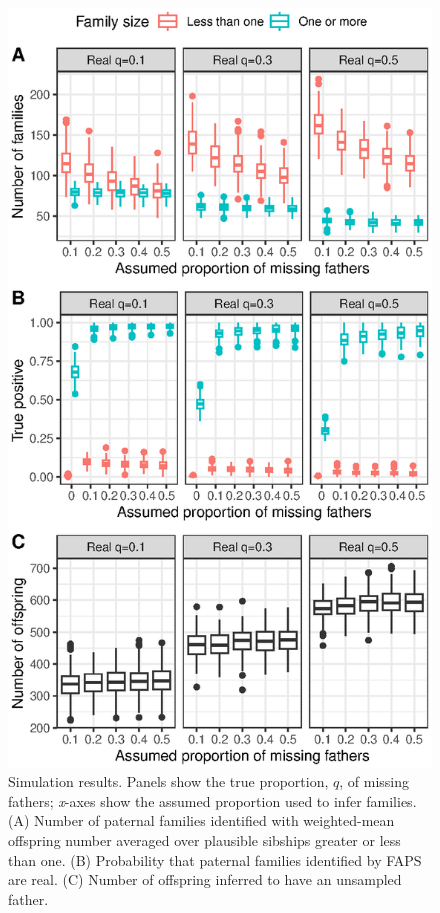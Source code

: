 \documentclass[10pt, a4paper, twocolumn]{article} %
\begin{document}
\begin{figure}
    \centering
    \includegraphics{simulations.eps}
    \caption{
        Simulation results.
        Panels show the true proportion, $q$, of missing fathers; \textit{x}-axes show the assumed proportion used to infer families.
        (A) Number of paternal families identified with weighted-mean offspring number averaged over plausible sibships greater or less than one.
        (B) Probability that paternal families identified by FAPS are real.
        (C) Number of offspring inferred to have an unsampled father.
    }
    \label{fig:simulations}
\end{figure}
\end{document}

